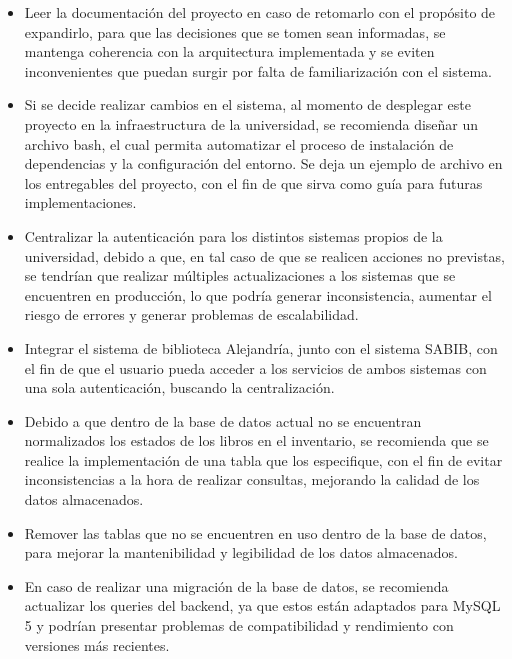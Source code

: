 \documentclass[spanish]{ieee_upb}
\begin{document}
\begin{itemize}
  \item Leer la documentación del proyecto en caso de retomarlo con el propósito de expandirlo, para que las decisiones que se tomen sean informadas, se mantenga coherencia con la arquitectura implementada y se eviten inconvenientes que puedan surgir por falta de familiarización con el sistema.
  \item Si se decide realizar cambios en el sistema, al momento de desplegar este proyecto en la infraestructura de la universidad, se recomienda diseñar un archivo bash, el cual permita automatizar el proceso de instalación de dependencias y la configuración del entorno. Se deja un ejemplo de archivo en los entregables del proyecto, con el fin de que sirva como guía para futuras implementaciones.
  \item Centralizar la autenticación para los distintos sistemas propios de la universidad, debido a que, en tal caso de que se realicen acciones no previstas, se tendrían que realizar múltiples actualizaciones a los sistemas que se encuentren en producción, lo que podría generar inconsistencia, aumentar el riesgo de errores y generar problemas de escalabilidad.
  \item Integrar el sistema de biblioteca Alejandría, junto con el sistema SABIB, con el fin de que el usuario pueda acceder a los servicios de ambos sistemas con una sola autenticación, buscando la centralización.
  \item Debido a que dentro de la base de datos actual no se encuentran normalizados los estados de los libros en el inventario, se recomienda que se realice la implementación de una tabla que los especifique, con el fin de evitar inconsistencias a la hora de realizar consultas, mejorando la calidad de los datos almacenados.
  \item Remover las tablas que no se encuentren en uso dentro de la base de datos, para mejorar la mantenibilidad y legibilidad de los datos almacenados.
  \item En caso de realizar una migración de la base de datos, se recomienda actualizar los queries del backend, ya que estos están adaptados para MySQL 5 y podrían presentar problemas de compatibilidad y rendimiento con versiones más recientes.
\end{itemize}

\newpage
\renewcommand\refname{REFERENCIAS}

\newpage
\renewcommand\refname{REFERENCIAS}


\end{document}

